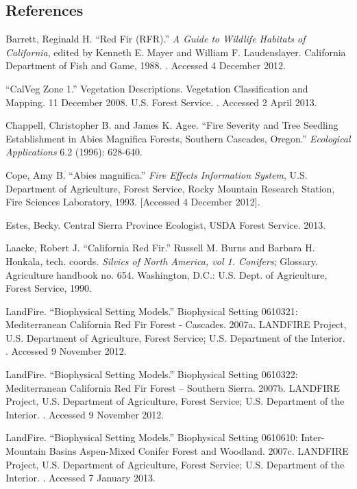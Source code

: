 \subsection*{References}
\begin{hangparas}{.25in}{1} 
Barrett, Reginald H. ``Red Fir (RFR).'' \emph{A Guide to Wildlife Habitats of California}, edited by Kenneth E. Mayer and William F. Laudenslayer. California Department of Fish and Game, 1988. . Accessed 4 December 2012.

``CalVeg Zone 1.'' Vegetation Descriptions. Vegetation Classification and Mapping.  11 December 2008. U.S. Forest Service. . Accessed 2 April 2013.

Chappell, Christopher B. and James K. Agee. ``Fire Severity and Tree Seedling Establishment in Abies Magnifica Forests, Southern Cascades, Oregon.'' \emph{Ecological Applications} 6.2 (1996): 628-640.

Cope, Amy B. ``Abies magnifica.'' \emph{Fire Effects Information System}, U.S. Department of Agriculture, Forest Service,  Rocky Mountain Research Station, Fire Sciences Laboratory, 1993.  [Accessed 4 December 2012].

Estes, Becky. Central Sierra Province Ecologist, USDA Forest Service. 2013.

Laacke, Robert J. ``California Red Fir.'' Russell M. Burns and Barbara H. Honkala, tech. coords. \emph{Silvics of North America, vol 1. Conifers}; Glossary. Agriculture handbook no. 654. Washington, D.C.: U.S. Dept. of Agriculture, Forest Service, 1990. 

LandFire. ``Biophysical Setting Models.'' Biophysical Setting 0610321: Mediterranean California Red Fir Forest - Cascades. 2007a. LANDFIRE Project, U.S. Department of Agriculture, Forest Service; U.S. Department of the Interior. . Accessed 9 November 2012.

LandFire. ``Biophysical Setting Models.'' Biophysical Setting 0610322: Mediterranean California Red Fir Forest – Southern Sierra. 2007b. LANDFIRE Project, U.S. Department of Agriculture, Forest Service; U.S. Department of the Interior. . Accessed 9 November 2012.

LandFire. ``Biophysical Setting Models.'' Biophysical Setting 0610610: Inter-Mountain Basins Aspen-Mixed Conifer Forest and Woodland. 2007c. LANDFIRE Project, U.S. Department of Agriculture, Forest Service; U.S. Department of the Interior. . Accessed 7 January 2013.


\end{hangparas}
